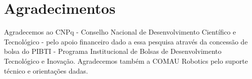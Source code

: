 \section{Agradecimentos}
    Agradecemos ao CNPq - Conselho Nacional de Desenvolvimento Científico e Tecnológico - pelo apoio financeiro dado a essa pesquisa através da concessão de bolsa do PIBTI - Programa Institucional de Bolsas de Desenvolvimento Tecnológico e Inovação. Agradecemos também a COMAU Robotics pelo suporte técnico e orientações dadas.